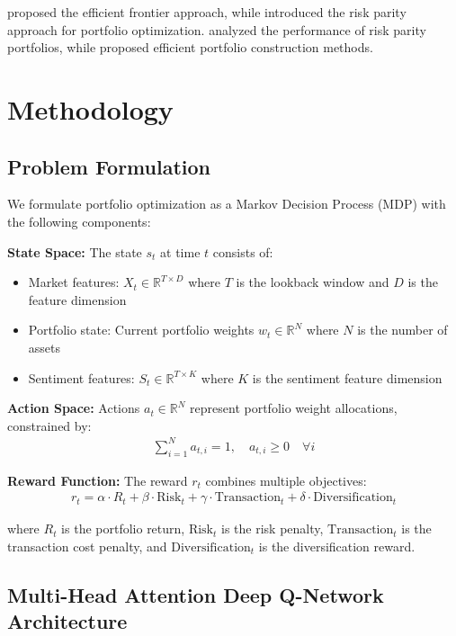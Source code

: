 \documentclass[11pt]{article}
\begin{document}
\citet{bailey2014efficient} proposed the efficient frontier approach, while \citet{clarke2011risk} introduced the risk parity approach for portfolio optimization. \citet{maillard2010performance} analyzed the performance of risk parity portfolios, while \citet{chaves2011efficient} proposed efficient portfolio construction methods.

\section{Methodology}

\subsection{Problem Formulation}

We formulate portfolio optimization as a Markov Decision Process (MDP) with the following components:

\textbf{State Space:} The state $s_t$ at time $t$ consists of:
\begin{itemize}
    \item Market features: $X_t \in \mathbb{R}^{T \times D}$ where $T$ is the lookback window and $D$ is the feature dimension
    \item Portfolio state: Current portfolio weights $w_t \in \mathbb{R}^N$ where $N$ is the number of assets
    \item Sentiment features: $S_t \in \mathbb{R}^{T \times K}$ where $K$ is the sentiment feature dimension
\end{itemize}

\textbf{Action Space:} Actions $a_t \in \mathbb{R}^N$ represent portfolio weight allocations, constrained by:
\begin{align}
    \sum_{i=1}^N a_{t,i} = 1, \quad a_{t,i} \geq 0 \quad \forall i
\end{align}

\textbf{Reward Function:} The reward $r_t$ combines multiple objectives:
\begin{align}
    r_t = \alpha \cdot R_t + \beta \cdot \text{Risk}_t + \gamma \cdot \text{Transaction}_t + \delta \cdot \text{Diversification}_t
\end{align}

where $R_t$ is the portfolio return, $\text{Risk}_t$ is the risk penalty, $\text{Transaction}_t$ is the transaction cost penalty, and $\text{Diversification}_t$ is the diversification reward.

\subsection{Multi-Head Attention Deep Q-Network Architecture}
\end{document}
